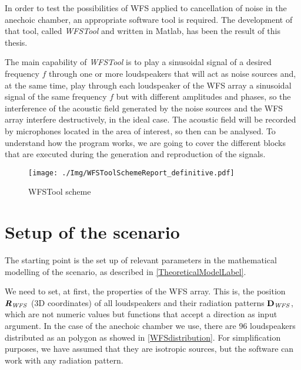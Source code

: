 In order to test the possibilities of WFS applied to cancellation of noise in the anechoic chamber, an appropriate software tool is required. The development of that tool, called \textit{WFSTool} and written in Matlab, has been the result of this thesis.

The main capability of \textit{WFSTool} is to play a sinusoidal signal of a desired frequency $f$ through one or more loudspeakers that will act as noise sources and, at the same time, play through each loudspeaker of the WFS array a sinusoidal signal of the same frequency $f$ but with different amplitudes and phases, so the interference of the acoustic field generated by the noise sources and the WFS array interfere destructively, in the ideal case. The acoustic field will be recorded by microphones located in the area of interest, so then can be analysed. To understand how the program works, we are going to cover the different blocks that are executed during the generation and reproduction of the signals.

%	
%
%	

\begin{figure}
	\centering
	\texttt{[image: ./Img/WFSToolSchemeReport\_definitive.pdf]}
	\caption{WFSTool scheme}
	\label{figWFSToolScheme}
\end{figure}

\section{Setup of the scenario}
The starting point is the set up of relevant parameters in the mathematical modelling of the scenario, as described in \autoref{TheoreticalModelLabel}.

We need to set, at first, the properties of the WFS array. This is, the position $\Pos[mat][WFS]$ (3D coordinates) of all loudspeakers and their radiation patterns $\Diag[vec][WFS]$, which are not numeric values but functions that accept a direction as input argument. In the case of the anechoic chamber we use, there are 96 loudspeakers distributed as an polygon as showed in \autoref{WFSdistribution}. For simplification purposes, we have assumed that they are isotropic sources, but the software can work with any radiation pattern.

